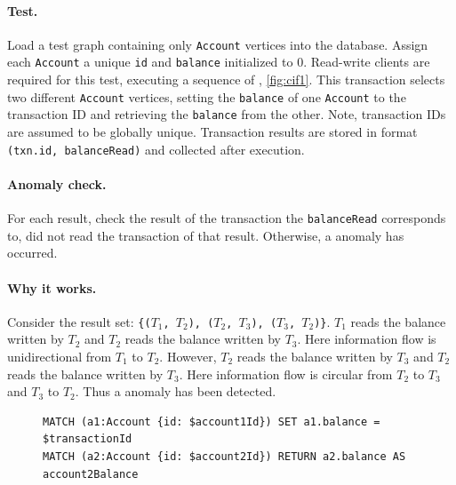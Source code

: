 \paragraph{Test.}
Load a test graph containing only \texttt{Account} vertices into the database.
Assign each \texttt{Account} a unique \texttt{id} and \texttt{balance}
initialized to 0. Read-write clients are required for this test, executing a
sequence of , \autoref{fig:cif1}. This transaction
selects two different \texttt{Account} vertices, setting the \texttt{balance} of
one \texttt{Account} to the transaction ID and retrieving the \texttt{balance}
from the other. Note, transaction IDs are assumed to be globally unique.
Transaction results are stored in format \texttt{(txn.id, balanceRead)} and
collected after execution.

\paragraph{Anomaly check.}
For each result, check the result of the transaction the \texttt{balanceRead}
corresponds to, did not read the transaction of that result. Otherwise, a
 anomaly has occurred.

\paragraph{Why it works.}
Consider the result set:
\texttt{\{($T_\mathrm{1}$, $T_\mathrm{2}$), ($T_\mathrm{2}$, $T_\mathrm{3}$),
  ($T_\mathrm{3}$, $T_\mathrm{2}$)\}}. $T_\mathrm{1}$ reads the balance written by
$T_\mathrm{2}$ and $T_\mathrm{2}$ reads the balance written by $T_\mathrm{3}$.
Here information flow is unidirectional from $T_\mathrm{1}$ to $T_\mathrm{2}$.
However, $T_\mathrm{2}$ reads the balance written by $T_\mathrm{3}$ and
$T_\mathrm{2}$ reads the balance written by $T_\mathrm{3}$. Here information flow
is circular from $T_\mathrm{2}$ to $T_\mathrm{3}$ and $T_\mathrm{3}$ to $T_\mathrm{2}$.
Thus a  anomaly has been detected.

\begin{figure}[htb]
  \begin{lstlisting}[language=cypher,label=fig:cif1,caption=\tx{G1c $T_\mathrm{RW}$}.]
MATCH (a1:Account {id: $account1Id}) SET a1.balance = $transactionId
MATCH (a2:Account {id: $account2Id}) RETURN a2.balance AS account2Balance
\end{lstlisting}
\end{figure}

